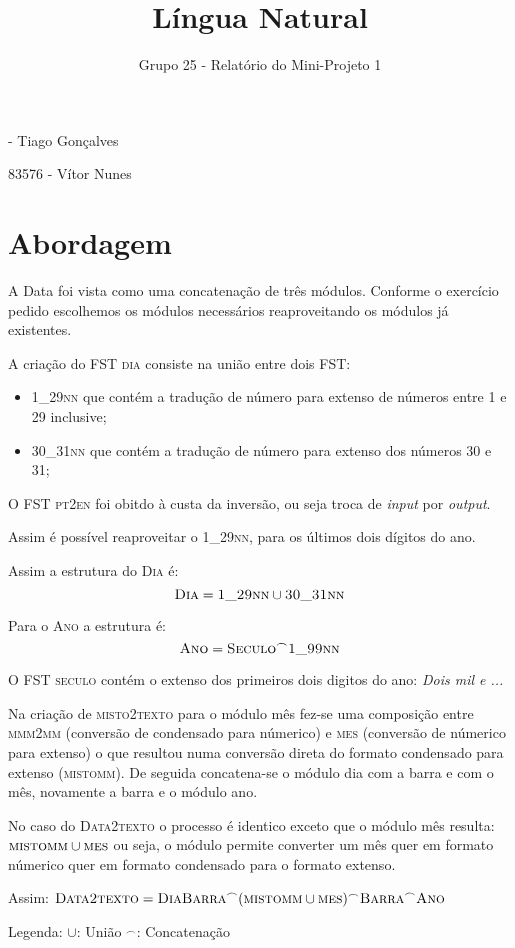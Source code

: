 \documentclass[12pt]{article}
\begin{document}
\title{\vspace{-3cm}Língua Natural}
\author{Grupo 25 - Relatório do Mini-Projeto 1}
\date{}

 - Tiago Gonçalves

83576 - Vítor Nunes

\section*{Abordagem}
A Data foi vista como uma concatenação de três módulos. Conforme o exercício pedido escolhemos os módulos necessários reaproveitando os módulos já existentes.
\newline

A criação do FST \textsc{dia} consiste na união entre dois FST:
\begin{itemize}
	\item \textsc{1{\_}29nn} que contém a tradução de número para extenso de números entre 1 e 29 inclusive;
	\item \textsc{30{\_}31nn} que contém a tradução de número para extenso dos números 30 e 31; \newline
\end{itemize}

O FST \textsc{pt2en} foi obitdo à custa da inversão, ou seja troca de \textit{input} por \textit{output}.

Assim é possível reaproveitar o \textsc{1{\_}29nn}, para os últimos dois dígitos do ano.

Assim a estrutura do \textsc{Dia} é:
$$ \textsc{Dia} = \textsc{1{\_}29nn} \cup \textsc{30{\_}31nn}  $$

Para o \textsc{Ano} a estrutura é:
$$ \textsc{Ano} = \textsc{Seculo} ^\frown \textsc{1{\_}99nn}  $$

O FST \textsc{seculo} contém o extenso dos primeiros dois digitos do ano: \textit{Dois mil e ...} \newline

Na criação de \textsc{misto2texto} para o módulo mês fez-se uma composição entre \textsc{mmm2mm} (conversão de condensado para númerico) e \textsc{mes} (conversão de númerico para extenso) o que resultou numa conversão direta do formato condensado para extenso (\textsc{mistomm}).
De seguida concatena-se o módulo dia com a barra e com o mês, novamente a barra e o módulo ano. \newline

No caso do \textsc{Data2texto} o processo é identico exceto que o módulo mês resulta: $\textsc{mistomm} \cup \textsc{mes}$ ou seja, o módulo permite converter um mês quer em formato númerico quer em formato condensado para o formato extenso.

Assim: $\textsc{Data2texto} = \textsc{DiaBarra} ^\frown (\textsc{mistomm} \cup \textsc{mes}) ^\frown \textsc{Barra} ^\frown \textsc{Ano} \newline$


Legenda: $\cup$: União $^\frown$: Concatenação
\end{document}
